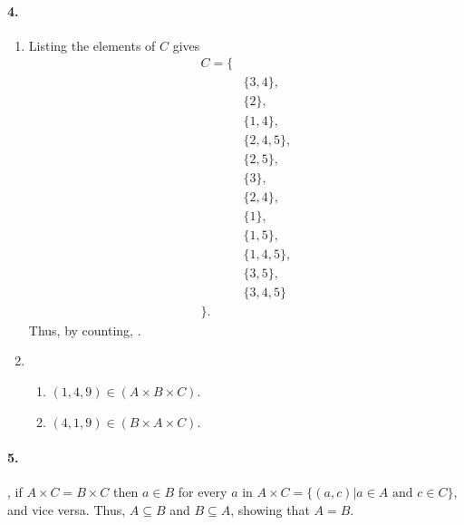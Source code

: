 \documentclass[12pt]{article}
\newcommand{\qa}{\\[0.5\baselineskip]}  %
\begin{document}
\paragraph{4.}
\begin{enumerate}[label=\textbf{\alph*.}]
    \item %
    Listing the elements of $C$ gives
    \begin{align*}
        C = \{ & \\
        & \{3, 4\}, \\
        & \{2\}, \\
        & \{1, 4\}, \\
        & \{2, 4, 5\}, \\
        & \{2, 5\}, \\
        & \{3\}, \\
        & \{2, 4\}, \\
        & \{1\}, \\
        & \{1, 5\}, \\
        & \{1, 4, 5\}, \\
        & \{3, 5\}, \\
        & \{3, 4, 5\} \\
        \}.
    \end{align*}
    Thus, by counting, .
    \item %
    \begin{enumerate}[label=\textbf{\roman*.}]
        \item $\boxed{(1, 4, 9)} \in (A \times B \times C)$.
        \item $\boxed{(4, 1, 9)} \in (B \times A \times C)$.
    \end{enumerate}
\end{enumerate}

\paragraph{5.}
{}, if $A \times C = B \times C$ then $a \in B$ for every $a$ in
$A \times C = \{(a, c) | a \in A \text{ and } c \in C\}$, and vice versa. Thus,
$A \subseteq B$ and $B \subseteq A$, showing that $A = B$.
\end{document}
